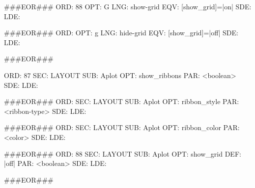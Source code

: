 \documentclass[11pt]{article}
\def\nwendcode{\endtrivlist \endgroup} %
\let\nwdocspar=\par                    %
\begin{document}
###EOR###
ORD: 88
OPT: G
LNG: show-grid
EQV: [show_grid]=|on|
SDE: 
LDE: 

###EOR###
ORD: 
OPT: g
LNG: hide-grid
EQV: [show_grid]=|off|
SDE: 
LDE: 

###EOR###
\nwendcode{}\nwdocspar
\nwenddocs{}\plusendmoddef
ORD: 87
SEC: LAYOUT
SUB: Aplot
OPT: show_ribbons
PAR: <boolean>
SDE: 
LDE: 

###EOR###
ORD: 
SEC: LAYOUT
SUB: Aplot
OPT: ribbon_style
PAR: <ribbon-type>
SDE: 
LDE: 

###EOR###
ORD: 
SEC: LAYOUT
SUB: Aplot
OPT: ribbon_color
PAR: <color>
SDE: 
LDE: 

###EOR###
ORD: 88
SEC: LAYOUT
SUB: Aplot
OPT: show_grid
DEF: |off|
PAR: <boolean>
SDE: 
LDE: 

###EOR###
\nwendcode{}\nwdocspar
\end{document}
